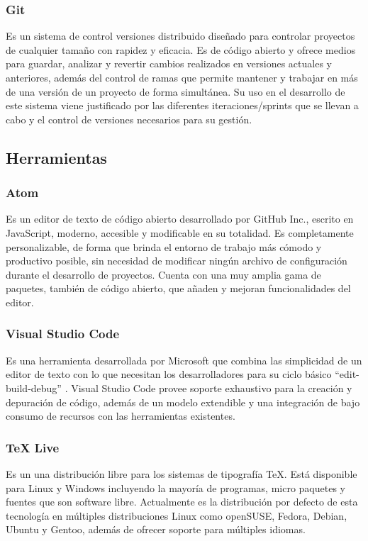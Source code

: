 \documentclass[12pt]{article}
\begin{document}
        \subsubsection{Git}
            Es un sistema de control versiones distribuido diseñado para controlar proyectos de cualquier tamaño con rapidez y eficacia. Es de código abierto y ofrece medios para guardar, analizar y revertir cambios realizados en versiones actuales y anteriores, además del control de ramas que permite mantener y trabajar en más de una versión de un proyecto de forma simultánea. Su uso en el desarrollo de este sistema viene justificado por las diferentes iteraciones/sprints que se llevan a cabo y el control de versiones necesarios para su gestión.

    \subsection{Herramientas} 
        \subsubsection{Atom}
            Es un editor de texto de código abierto desarrollado por GitHub Inc., escrito en JavaScript, moderno, accesible y modificable en su totalidad. Es completamente personalizable, de forma que brinda el entorno de trabajo más cómodo y productivo posible, sin necesidad de modificar ningún archivo de configuración durante el desarrollo de proyectos. Cuenta con una muy amplia gama de paquetes, también de código abierto, que añaden y mejoran funcionalidades del editor.

        \subsubsection{Visual Studio Code}
            Es una herramienta desarrollada por Microsoft que combina las simplicidad de un editor de texto con lo que necesitan los desarrolladores para su ciclo básico ``edit-build-debug'' . Visual Studio Code provee soporte exhaustivo para la creación y depuración de código, además de un modelo extendible y una integración de bajo consumo de recursos con las herramientas existentes.

        \subsubsection{TeX Live}
            Es un una distribución libre para los sistemas de tipografía TeX. Está disponible para Linux y Windows incluyendo la mayoría de programas, micro paquetes y fuentes que son software libre. Actualmente es la distribución por defecto de esta tecnología en múltiples distribuciones Linux como openSUSE, Fedora, Debian, Ubuntu y Gentoo, además de ofrecer soporte para múltiples idiomas.
\end{document}
